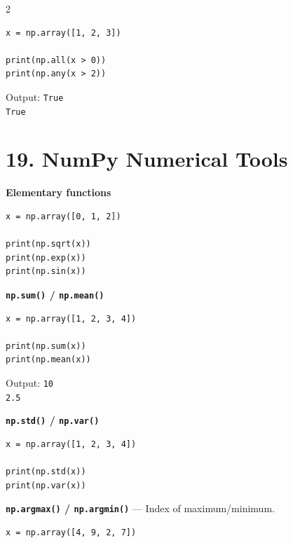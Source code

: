 \documentclass[10pt,a4paper]{article}
\begin{document}
\begin{multicols}{2}
\begin{card}
\begin{lstlisting}[style=pythonstyle]
x = np.array([1, 2, 3])

print(np.all(x > 0))
print(np.any(x > 2))
\end{lstlisting}

Output:
\texttt{True}\\
\texttt{True}
\end{card}

\section*{19. NumPy Numerical Tools}

\begin{card}
\textbf{Elementary functions}

\begin{lstlisting}[style=pythonstyle]
x = np.array([0, 1, 2])

print(np.sqrt(x))
print(np.exp(x))
print(np.sin(x))
\end{lstlisting}
\end{card}

\begin{card}
\textbf{\texttt{np.sum()} / \texttt{np.mean()}}

\begin{lstlisting}[style=pythonstyle]
x = np.array([1, 2, 3, 4])

print(np.sum(x))
print(np.mean(x))
\end{lstlisting}

Output:
\texttt{10}\\
\texttt{2.5}
\end{card}

\begin{card}
\textbf{\texttt{np.std()} / \texttt{np.var()}}

\begin{lstlisting}[style=pythonstyle]
x = np.array([1, 2, 3, 4])

print(np.std(x))
print(np.var(x))
\end{lstlisting}
\end{card}

\begin{card}
\textbf{\texttt{np.argmax()} / \texttt{np.argmin()}} --- Index of maximum/minimum.

\begin{lstlisting}[style=pythonstyle]
x = np.array([4, 9, 2, 7])


\end{lstlisting}
\end{card}
\end{multicols}
\end{document}
